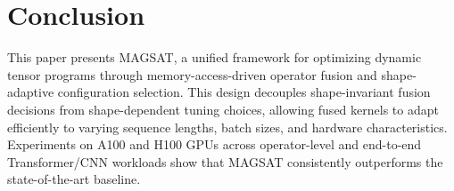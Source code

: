 \section{Conclusion}%
\label{sec:conclusion}

This paper presents MAGSAT, a unified framework for optimizing dynamic tensor programs 
through memory-access-driven operator fusion and shape-adaptive configuration selection. 
This design decouples shape-invariant 
fusion decisions from shape-dependent tuning choices, allowing fused kernels to adapt
efficiently to varying sequence lengths, batch sizes, and hardware characteristics. 
Experiments on A100 and H100 GPUs across operator-level and end-to-end Transformer/CNN 
workloads show that MAGSAT consistently outperforms the state-of-the-art baseline. 
